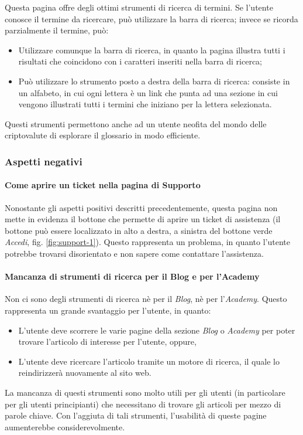 Questa pagina offre degli ottimi strumenti di ricerca di termini. Se 
l'utente conosce il termine da ricercare, può utilizzare la barra di ricerca; 
invece se ricorda parzialmente il termine, può:
\begin{itemize}
  \item Utilizzare comunque la barra di ricerca, in quanto la pagina 
  illustra tutti i risultati che coincidono con i caratteri inseriti nella 
  barra di ricerca;

  \item Può utilizzare lo strumento posto a destra della barra di ricerca: 
  consiste in un alfabeto, in cui ogni lettera è un link che punta ad una 
  sezione in cui vengono illustrati tutti i termini che iniziano per la 
  lettera selezionata.
\end{itemize}
Questi strumenti permettono anche ad un utente neofita del mondo delle 
criptovalute di esplorare il glossario in modo efficiente.

\subsubsection{Aspetti negativi}

\paragraph{Come aprire un ticket nella pagina di Supporto}

Nonostante gli aspetti positivi descritti precedentemente, questa pagina 
non mette in evidenza il bottone che permette di aprire un ticket di 
assistenza (il bottone può essere localizzato in alto a destra, a 
sinistra del bottone verde \textit{Accedi}, fig. \ref{fig:support-1}). 
Questo rappresenta un problema, in quanto l'utente potrebbe trovarsi 
disorientato e non sapere come contattare l'assistenza.

\paragraph{Mancanza di strumenti di ricerca per il Blog e per l'Academy}

Non ci sono degli strumenti di ricerca nè per il \textit{Blog}, nè per 
l'\textit{Academy}. Questo rappresenta un grande svantaggio per l'utente, 
in quanto:
\begin{itemize}
  \item L'utente deve scorrere le varie pagine della sezione \textit{Blog} 
  o \textit{Academy} per poter trovare l'articolo di interesse per l'utente, 
  oppure, 

  \item L'utente deve ricercare l'articolo tramite un motore di ricerca, 
  il quale lo reindirizzerà nuovamente al sito web.
\end{itemize}
La mancanza di questi strumenti sono molto utili per gli utenti (in 
particolare per gli utenti principianti) che necessitano di trovare 
gli articoli per mezzo di parole chiave. Con l'aggiuta di tali strumenti, 
l'usabilità di queste pagine aumenterebbe considerevolmente.

